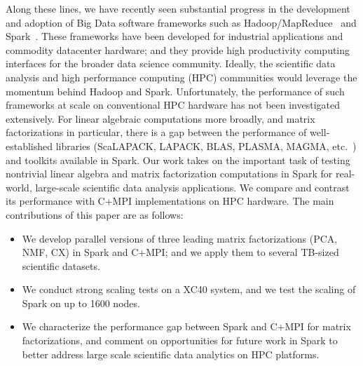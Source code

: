 Along these lines, we have recently seen substantial progress in the development and adoption of Big Data software frameworks such as Hadoop/MapReduce~\cite{DG04} and Spark~\cite{SPARK_HOTC_10}. 
These frameworks have been developed for industrial applications and commodity datacenter hardware; and they provide high productivity computing interfaces for the broader data science community.  
Ideally, the scientific data analysis and high performance computing (HPC) communities would leverage the momentum behind Hadoop and Spark.
Unfortunately, the performance of such frameworks at scale on conventional HPC hardware has not been investigated extensively. 
For linear algebraic computations more broadly, and matrix factorizations in particular, there is a gap between the performance of  well-established libraries (ScaLAPACK, LAPACK, BLAS, PLASMA, MAGMA, etc.~\cite{lapack99,PlasmaMagma2009}) and toolkits available in Spark. 
Our work takes on the important task of testing nontrivial linear algebra and matrix factorization computations in Spark for real-world, large-scale scientific data analysis applications. We compare and contrast its performance with C+MPI implementations on HPC hardware. The main contributions of this paper are as follows:
\begin{itemize}
\item{We develop parallel versions of three leading matrix factorizations (PCA, NMF, CX) in Spark and C+MPI; and we apply them to several TB-sized scientific datasets.}
\item{We conduct strong scaling tests on a XC40 system, and we test the scaling of Spark on up to 1600 nodes.}
\item{We characterize the performance gap between Spark and C+MPI for matrix factorizations, and  comment on opportunities for future work in Spark to better address large scale scientific data analytics on HPC platforms.}
\end{itemize}

